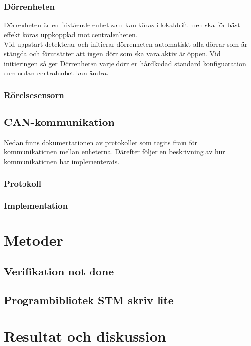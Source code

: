 \documentclass{article}
\begin{document}
\subsubsection{Dörrenheten}
Dörrenheten är en fristående enhet som kan köras i lokaldrift
men ska för bäst effekt köras uppkopplad mot centralenheten.\\
Vid uppstart detekterar och initierar dörrenheten automatiskt alla dörrar som
är stängda och förutsätter att ingen dörr som ska vara aktiv är
öppen. Vid initieringen så ger Dörrenheten varje dörr en hårdkodad
standard konfiguaration som sedan centralenhet kan ändra. 
\subsubsection{Rörelsesensorn}
\subsection{CAN-kommunikation}
\label{can}
Nedan finns dokumentationen av protokollet som tagits fram för kommunikationen mellan enheterna. Därefter följer en beskrivning av hur kommunikationen har implementerats.
\subsubsection{Protokoll}

\subsubsection{Implementation}

\section{Metoder}
\subsection{Verifikation not done}
\subsection{Programbibliotek STM skriv lite}


\section{Resultat och diskussion} %
\end{document}
